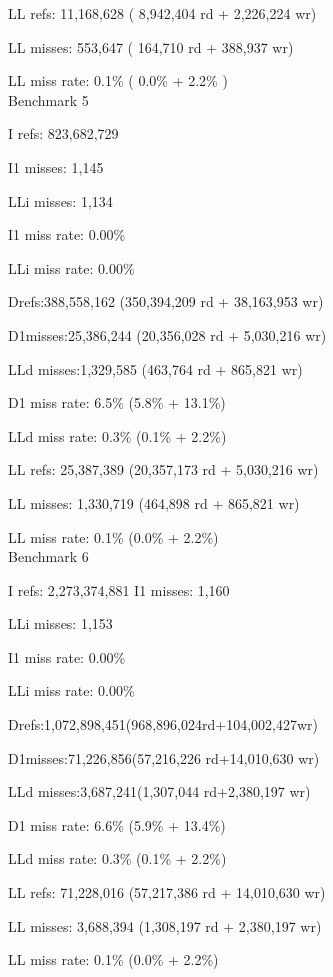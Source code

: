 \documentclass{article}
\begin{document}
\begin{multicols}{2}
        LL refs:        11,168,628  (  8,942,404 rd   +  2,226,224 wr)
        
        LL misses:         553,647  (    164,710 rd   +    388,937 wr)
        
        LL miss rate:          0.1\% (        0.0\%     +        2.2\%  )\\
        
        
        Benchmark 5

        I   refs:      823,682,729
        
        I1  misses:          1,145
        
        LLi misses:          1,134
        
        I1  miss rate:        0.00\%
        
        LLi miss rate:        0.00\%
        
        Drefs:388,558,162  (350,394,209 rd + 38,163,953 wr)
        
        D1misses:25,386,244  (20,356,028 rd + 5,030,216 wr)
        
        LLd misses:1,329,585  (463,764 rd + 865,821 wr)
        
        D1  miss rate:         6.5\% (5.8\% + 13.1\%)
        
        LLd miss rate:         0.3\% (0.1\% + 2.2\%)
        
        LL refs:        25,387,389  (20,357,173 rd + 5,030,216 wr)
        
        LL misses:       1,330,719  (464,898 rd + 865,821 wr)
        
        LL miss rate:          0.1\% (0.0\% + 2.2\%)\\
        
        
        Benchmark 6

        I   refs:      2,273,374,881
        I1  misses:            1,160
        
        LLi misses:            1,153
        
        I1  miss rate:          0.00\%
        
        LLi miss rate:          0.00\%
        
        Drefs:1,072,898,451(968,896,024rd+104,002,427wr)
        
        D1misses:71,226,856(57,216,226 rd+14,010,630 wr)
        
        LLd misses:3,687,241(1,307,044 rd+2,380,197 wr)
        
        D1  miss rate:           6.6\% (5.9\% + 13.4\%)
        
        LLd miss rate:           0.3\% (0.1\% + 2.2\%)
        
        LL refs:          71,228,016  (57,217,386 rd + 14,010,630 wr)
        
        LL misses:         3,688,394  (1,308,197 rd + 2,380,197 wr)
        
        LL miss rate:            0.1\% (0.0\% + 2.2\%)\\
        
    \end{multicols}
    
\end{document}
